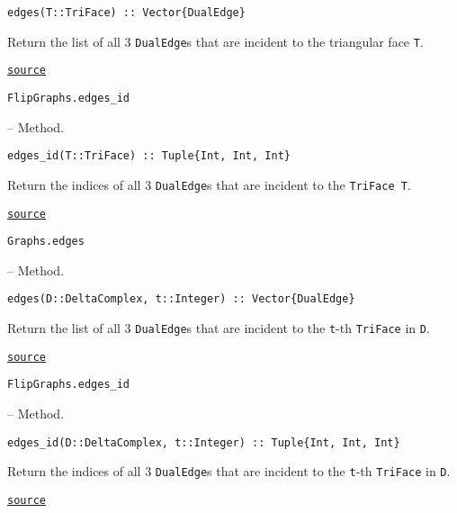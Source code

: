 \begin{adjustwidth}{2em}{0pt}


\begin{verbatim}
edges(T::TriFace) :: Vector{DualEdge}
\end{verbatim}

Return the list of all 3 \texttt{DualEdge}s that are incident to the triangular face \texttt{T}. 



\href{https://github.com/schto223/FlipGraphs.jl/blob/e35d43698a06b86273148826b79d585ba04fcd26/src/deltaComplex.jl#L220-L224}{\texttt{source}}


\end{adjustwidth}
\hypertarget{10965646028083896720}{\texttt{FlipGraphs.edges\_id}}  -- {Method.}

\begin{adjustwidth}{2em}{0pt}


\begin{verbatim}
edges_id(T::TriFace) :: Tuple{Int, Int, Int}
\end{verbatim}

Return the indices of all 3 \texttt{DualEdge}s that are incident to the \texttt{TriFace T}. 



\href{https://github.com/schto223/FlipGraphs.jl/blob/e35d43698a06b86273148826b79d585ba04fcd26/src/deltaComplex.jl#L241-L245}{\texttt{source}}


\end{adjustwidth}
\hypertarget{15082074870570804350}{\texttt{Graphs.edges}}  -- {Method.}

\begin{adjustwidth}{2em}{0pt}


\begin{verbatim}
edges(D::DeltaComplex, t::Integer) :: Vector{DualEdge}
\end{verbatim}

Return the list of all 3 \texttt{DualEdge}s that are incident to the \texttt{t}-th \texttt{TriFace} in \texttt{D}. 



\href{https://github.com/schto223/FlipGraphs.jl/blob/e35d43698a06b86273148826b79d585ba04fcd26/src/deltaComplex.jl#L227-L231}{\texttt{source}}


\end{adjustwidth}
\hypertarget{16383920566377462491}{\texttt{FlipGraphs.edges\_id}}  -- {Method.}

\begin{adjustwidth}{2em}{0pt}


\begin{verbatim}
edges_id(D::DeltaComplex, t::Integer) :: Tuple{Int, Int, Int}
\end{verbatim}

Return the indices of all 3 \texttt{DualEdge}s that are incident to the \texttt{t}-th \texttt{TriFace} in \texttt{D}. 



\href{https://github.com/schto223/FlipGraphs.jl/blob/e35d43698a06b86273148826b79d585ba04fcd26/src/deltaComplex.jl#L234-L238}{\texttt{source}}


\end{adjustwidth}

